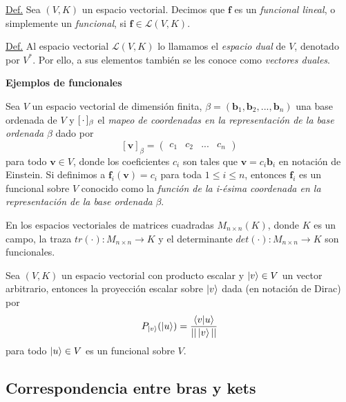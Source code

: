 \documentclass[12pt,libertine]{book}
\begin{document}
\vspace{3mm}
\begin{tcolorbox}
    \underline{Def.} Sea $(V,K)$ un espacio vectorial. Decimos que $\textbf{f}$ es un \emph{funcional lineal}, o simplemente un \emph{funcional}, si $\textbf{f}\in\mathcal{L}(V,K)$.

\vspace{3mm}
    \underline{Def.} Al espacio vectorial $\mathcal{L}(V,K)$ lo llamamos el \emph{espacio dual} de $V$, denotado por $V^*$. Por ello, a sus elementos también se les conoce como \emph{vectores duales}. 
\end{tcolorbox}

\vspace{3mm}
\textbf{Ejemplos de funcionales} \label{Ejem:Funcionales}

\vspace{3mm}
Sea $V$ un espacio vectorial de dimensión finita, $\beta=(\mathbf{b}_1,\mathbf{b}_2,...,\mathbf{b}_n)$ una base ordenada de $V$ y $[\hspace{0.5mm} \cdot\hspace{0.5mm}]_\beta$ el \emph{mapeo de coordenadas en la representación de la base ordenada} $\beta$ dado por $$[\mathbf{v}]_\beta=\begin{pmatrix} c_1&c_2&...&c_n \end{pmatrix}$$ para todo $\mathbf{v}\in V$, donde los coeficientes $c_i$ son tales que $\mathbf{v}=c_i \mathbf{b}_i$ en notación de Einstein. Si definimos a $\textbf{f}_i(\mathbf{v})=c_i$ para toda $1\le i\le n$, entonces $\textbf{f}_i$ es un funcional sobre $V$ conocido como la \emph{función de la i-ésima coordenada en la representación de la base ordenada} $\beta$. 

\vspace{3mm}
En los espacios vectoriales de matrices cuadradas $M_{n\times n}(K)$, donde $K$ es un campo, la traza $tr(\cdot):M_{n\times n}\to K$ y el determinante $det(\cdot):M_{n\times n}\to K$ son funcionales.

\vspace{3mm}
Sea $(V,K)$ un espacio vectorial con producto escalar y $\ket{v}\in V$ un vector arbitrario, entonces la proyección escalar sobre $\ket{v}$ dada (en notación de Dirac) por $$P_{\ket{{v}}}(\ket{u}) = \frac{\braket{v|u}}{||\ket{v}||}$$ para todo $\ket{u}\in V$ es un funcional sobre $V$. 

\newpage
\subsection*{Correspondencia entre bras y kets} \label{Subsec:Correspondencia entre bras y kets} 
\end{document}
